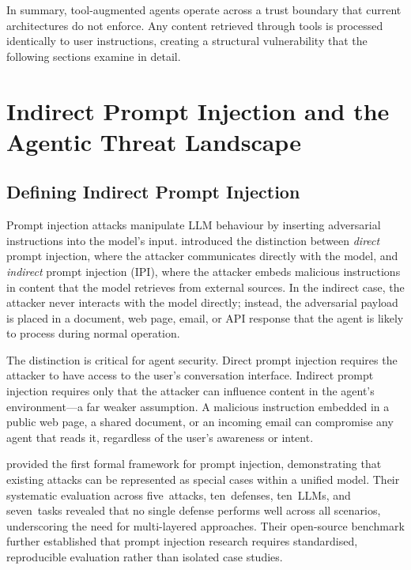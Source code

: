 \begin{justify}
In summary, tool-augmented agents operate across a trust boundary that current architectures do not enforce.  Any content retrieved through tools is processed identically to user instructions, creating a structural vulnerability that the following sections examine in detail.
\end{justify}


\section{Indirect Prompt Injection and the Agentic Threat Landscape}
\label{sec:ipi_threat}

\subsection{Defining Indirect Prompt Injection}

\begin{justify}
Prompt injection attacks manipulate LLM behaviour by inserting adversarial instructions into the model's input.  \cite{greshake2023not} introduced the distinction between \emph{direct} prompt injection, where the attacker communicates directly with the model, and \emph{indirect} prompt injection (IPI), where the attacker embeds malicious instructions in content that the model retrieves from external sources.  In the indirect case, the attacker never interacts with the model directly; instead, the adversarial payload is placed in a document, web page, email, or API response that the agent is likely to process during normal operation.
\end{justify}

\begin{justify}
The distinction is critical for agent security.  Direct prompt injection requires the attacker to have access to the user's conversation interface.  Indirect prompt injection requires only that the attacker can influence content in the agent's environment---a far weaker assumption.  A malicious instruction embedded in a public web page, a shared document, or an incoming email can compromise any agent that reads it, regardless of the user's awareness or intent.
\end{justify}

\begin{justify}
\cite{liu2024formalizing} provided the first formal framework for prompt injection, demonstrating that existing attacks can be represented as special cases within a unified model.  Their systematic evaluation across five~attacks, ten~defenses, ten~LLMs, and seven~tasks revealed that no single defense performs well across all scenarios, underscoring the need for multi-layered approaches.  Their open-source benchmark further established that prompt injection research requires standardised, reproducible evaluation rather than isolated case studies.
\end{justify}

